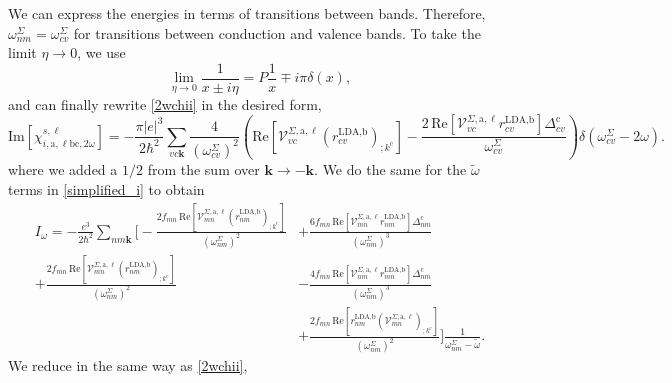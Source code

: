 \documentclass[letterpaper,aps]{revtex4}
\begin{document}
We can express the energies in terms of transitions between bands. 
Therefore, $\omega^{\Sigma}_{nm} = \omega^{\Sigma}_{cv}$ for transitions between 
conduction and valence bands. To take the limit $\eta\to 0$, we use
\begin{equation}\label{limit_eta}
\lim_{\eta\to 0}\frac{1}{x\pm i\eta}=P\frac{1}{x}\mp i\pi\delta(x),
\end{equation}
and can finally rewrite \eqref{2wchii} in the desired form,
\begin{equation}\label{imchi2w}
    \mathrm{Im}[\chi_{i,\text{a},\ell\text{b}\text{c},2\omega}^{s,\ell}] 
=   -\frac{\pi \vert e\vert^{3}}{2\hbar^2}\sum_{vc\mathbf{k}}
    \frac{4}{(\omega^{\Sigma}_{cv})^{2}}\left(\mathrm{Re}
    \left[\mathcal{V}^{\Sigma,\text{a},\ell}_{vc}
    \left(r^{\text{LDA,b}}_{cv}\right)_{;k^{\text{c}}}\right] 
-   \frac{2\,\mathrm{Re}\left[\mathcal{V}^{\Sigma,\text{a},\ell}_{vc}
    r^{\text{LDA,b}}_{cv}\right]\Delta^{\text{c}}_{cv}}{\omega^{\Sigma}_{cv}}\right)
    \delta(\omega^{\Sigma}_{cv}-2\omega)
.
\end{equation}
where we added a $1/2$ from the sum over $\mathbf{k} \rightarrow - \mathbf{k}$.
We do the same for the $\tilde\omega$ terms in \eqref{simplified_i} to obtain
\begin{align}\label{wchii}
I_{\omega}
= -\frac{e^3}{2\hbar^2}\sum_{nm\mathbf{k}}
\Biggl[
-   \frac{2f_{mn}\,\mathrm{Re}\left[\mathcal{V}^{\Sigma,\text{a},\ell}_{mn}
    \left(r^{\text{LDA,b}}_{nm}\right)_{;k^{\text{c}}}\right]}
    {(\omega^{\Sigma}_{nm})^{2}}
&+  \frac{6f_{mn}\,\mathrm{Re}\left[\mathcal{V}^{\Sigma,\text{a},\ell}_{mn}
    r^{\text{LDA,b}}_{nm}\right]\Delta^{\text{c}}_{nm}}{(\omega^{\Sigma}_{nm})^{3}}
    \nonumber\\
+   \frac{2f_{mn}\,\mathrm{Re}\left[\mathcal{V}^{\Sigma,\text{a},\ell}_{mn}
    \left(r^{\text{LDA,b}}_{nm}\right)_{;k^{\text{c}}}\right]}
    {(\omega^{\Sigma}_{nm})^{2}}
&-  \frac{4f_{mn}\,\mathrm{Re}\left[\mathcal{V}^{\Sigma,\text{a},\ell}_{nm}
    r^{\text{LDA,b}}_{mn}\right]\Delta_{nm}^{\text{c}}}{(\omega^{\Sigma}_{nm})^{3}}
    \nonumber\\
&+  \frac{2f_{mn}\,\mathrm{Re}\left[r^{\text{LDA,b}}_{nm}
    \left(\mathcal{V}^{\Sigma,\text{a},\ell}_{mn}\right)
    _{;k^{\text{c}}}\right]}{(\omega^{\Sigma}_{nm})^{2}}
\Biggr]\frac{1}{\omega^{\Sigma}_{nm}-\tilde\omega}
.
\end{align}
We reduce in the same way as \eqref{2wchii}, 
\end{document}
